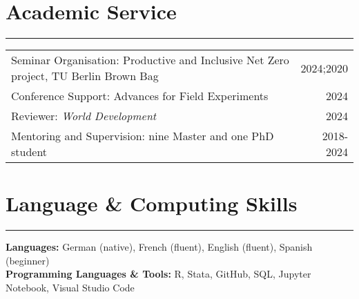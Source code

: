 \documentclass[10pt,a4paper]{article}
\begin{document}
\section*{Academic Service}
\hrule
\vspace{1mm}

\begin{tabularx}{\textwidth}{@{}Xr@{}}
Seminar Organisation: Productive and Inclusive Net Zero project, TU Berlin Brown Bag & \hfill 2024;2020 \\
Conference Support: Advances for Field Experiments & \hfill 2024 \\
Reviewer: \textit{World Development} & \hfill 2024 \\
Mentoring and Supervision: nine Master and one PhD student & \hfill 2018-2024 \\
\end{tabularx}


\section*{Language \& Computing Skills}
\hrule
\vspace{1mm}
\textbf{Languages:} German (native), French (fluent), English (fluent), Spanish (beginner) \\
\textbf{Programming Languages \& Tools:} R, Stata, GitHub, SQL, Jupyter Notebook, Visual Studio Code \\
\end{document}
